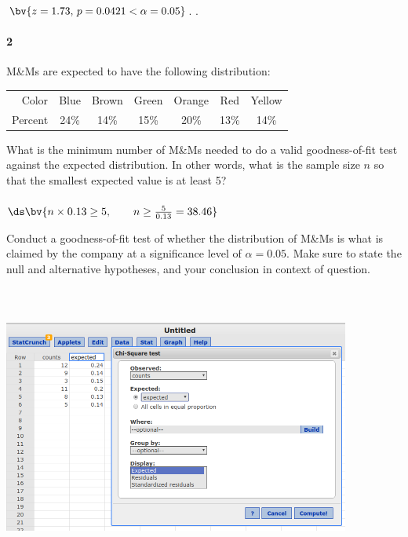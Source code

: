 \documentclass{article}
\begin{document}
\begin{flushleft}
\begin{enumalpha}
$\bv{z = 1.73, \, p = 0.0421 < \alpha = 0.05}$. .\\
\vspace{.5in}
\end{enumalpha}

\newpage
\paragraph{2} M\&Ms are expected to have the following distribution:\\
\smallskip
{\centering
\begin{tabular}{r | c c c c c c }
Color & Blue & Brown & Green & Orange & Red & Yellow\\
Percent & 24\% & 14\% & 15\% & 20\% & 13\% & 14\% 
\end{tabular}
\par} 
\begin{enumalpha}
\item What is the minimum number of M\&Ms needed to do a valid goodness-of-fit test against the expected distribution. In other words, what is the sample size $n$ so that the smallest expected value is at least 5?\\
\medskip
{}\\
\medskip
$\ds\bv{n \times 0.13 \ge 5, \qquad n \ge \frac 5 {0.13} = 38.46}$\\
\medskip
{}
\vspace{.5in}
\item Conduct a goodness-of-fit test of whether the distribution of M\&Ms is what is claimed by the company at a significance level of $\alpha=0.05$. Make sure to state the null and alternative hypotheses, and your conclusion in context of question.\\
\medskip
{}\\
\medskip
{}\\
\bigskip
{}\\
\medskip
\includegraphics[width=4.5in]{images/group10_Q2_b}\\

\end{enumalpha}
\end{flushleft}
\end{document}

